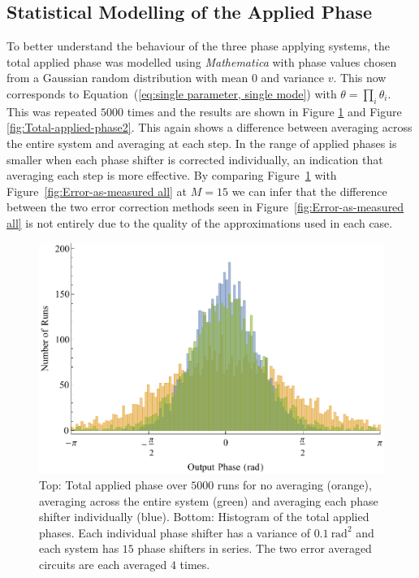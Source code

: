 \documentclass[aps,pra,twocolumn,superscriptaddress,numerical,floatfix]{revtex4-1}
\begin{document}


\subsection{Statistical Modelling of the Applied Phase\label{Statistical Modelling of the Applied Phase}}

To better understand the behaviour of the three phase applying systems, the total applied phase was modelled using \textit{Mathematica} with phase values chosen from a Gaussian random distribution with mean $0$ and variance $v$. This now corresponds to Equation~(\ref{eq:single parameter, single mode}) with $\theta=\prod_{i}\theta_{i}$. This was repeated $5000$ times and the results are shown in Figure \ref{fig:Total-applied-phase1} and Figure \ref{fig:Total-applied-phase2}. This again shows a difference between averaging across the entire system and averaging at each step. In the range of applied phases is smaller when each phase shifter is corrected individually, an indication that averaging each step is more effective. By comparing Figure~\ref{fig:Total-applied-phase1} with Figure~\ref{fig:Error-as-measured all} at $M=15$ we can infer that the difference between the two error correction methods seen in Figure~\ref{fig:Error-as-measured all} is not entirely due to the quality of the approximations used in each case.
%
\begin{figure}
\centerline{\includegraphics[width=\columnwidth]{totPhase1.pdf}}
\caption{Top: Total applied phase over $5000$ runs for no averaging (orange), averaging across the entire system (green) and averaging each phase shifter individually (blue). Bottom: Histogram of the total applied phases. Each individual phase shifter has a variance of $0.1\ \textrm{rad}^{2}$ and each system has $15$ phase shifters in series. The two error averaged circuits are each averaged $4$ times. \label{fig:Total-applied-phase1}}
\end{figure}
\end{document}
